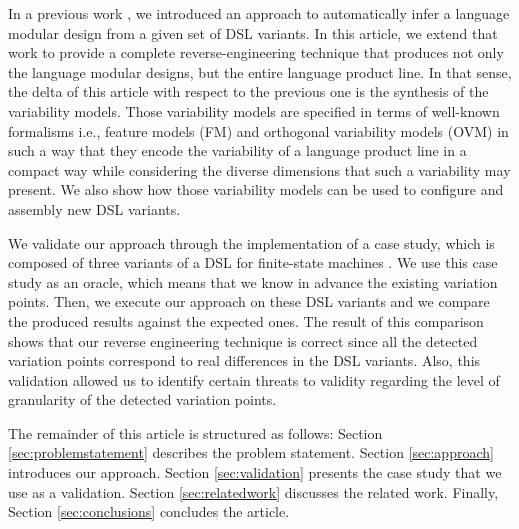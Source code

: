 In a previous work \cite{MendezAcuna:2016}, we introduced an approach to automatically infer a language modular design from a given set of DSL variants. In this article, we extend that work to provide a complete reverse-engineering technique that produces not only the language modular designs, but the entire language product line. In that sense, the delta of this article with respect to the previous one is the synthesis of the variability models. Those variability models are specified in terms of well-known formalisms  i.e., feature models (FM) and orthogonal variability models (OVM) in such a way that they encode the variability of a language product line in a compact way while considering the diverse dimensions that such a variability may present. We also show how those variability models can be used to configure and assembly new DSL variants.

We validate our approach through the implementation of a case study, which is composed of three variants of a DSL for finite-state machines \cite{Crane:2007}. We use this case study as an oracle, which means that we know in advance the existing variation points. Then, we execute our approach on these DSL variants and we compare the produced results against the expected ones. The result of this comparison shows that our reverse engineering technique is correct since all the detected variation points correspond to real differences in the DSL variants. Also, this validation allowed us to identify certain threats to validity regarding the level of granularity of the detected variation points. 

The remainder of this article is structured as follows: Section \ref{sec:problemstatement} describes the problem statement. Section \ref{sec:approach} introduces our approach. Section \ref{sec:validation} presents the case study that we use as a validation. Section \ref{sec:relatedwork} discusses the related work. Finally, Section \ref{sec:conclusions} concludes the article. 